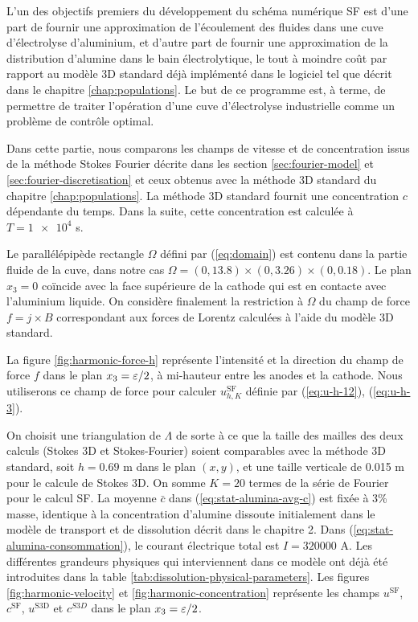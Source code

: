 L'un des objectifs premiers du développement du schéma numérique
SF est d'une part de fournir une approximation de l'écoulement des
fluides dans une cuve d'électrolyse d'aluminium, et d'autre part
de fournir une approximation de la distribution d'alumine dans le bain
électrolytique, le tout à moindre coût par rapport au modèle
3D standard déjà implémenté dans le logiciel \citealucell{} tel que décrit
dans le chapitre \ref{chap:populations}. Le but de ce programme est,
à terme, de permettre de traiter l'opération d'une cuve
d'électrolyse industrielle comme un problème de contrôle optimal.

Dans cette partie, nous comparons les champs de vitesse et de
concentration issus de la méthode Stokes Fourier décrite dans les
section \ref{sec:fourier-model} et \ref{sec:fourier-discretisation} et
ceux obtenus avec la méthode 3D standard du chapitre
\ref{chap:populations}. La méthode 3D standard fournit une
concentration $c$ dépendante du temps. Dans la suite, cette
concentration est calculée à $T = \num{1e4}$ \si{\second}.

Le parallélépipède rectangle $\Omega$ défini par (\ref{eq:domain}) est
contenu dans la partie fluide de la cuve, dans notre cas $\Omega = (0,
\num{13.8})\times(0,\num{3.26})\times(0,\num{0.18})$. Le plan $x_3 =
0$ coïncide avec la face supérieure de la cathode qui est en contacte
avec l'aluminium liquide. On considère finalement la restriction à
$\Omega$ du champ de force $f = j\times B$ correspondant aux forces de
Lorentz calculées à l'aide du modèle 3D standard.

La figure \ref{fig:harmonic-force-h} représente l'intensité et la
direction du champ de force $f$ dans le plan $x_3 = \varepsilon / 2$,
à mi-hauteur entre les anodes et la cathode. Nous utiliserons ce champ
de force pour calculer $u_{h,K}^\mathrm{SF}$ définie par
(\ref{eq:u-h-12}), (\ref{eq:u-h-3}).

On choisit une triangulation de $\Lambda$ de sorte à ce que la taille
des mailles des deux calculs (Stokes 3D et Stokes-Fourier) soient
comparables avec la méthode 3D standard, soit $h = \num{0.69}$
\si{\meter} dans le plan $(x,y)$, et une taille verticale de
\num{0.015} \si{\meter} pour le calcule de Stokes 3D. On somme $K =
20$ termes de la série de Fourier pour le calcul SF. La moyenne
$\bar{c}$ dans (\ref{eq:stat-alumina-avg-c}) est fixée à 3\% masse,
identique à la concentration d'alumine dissoute initialement dans le
modèle de transport et de dissolution décrit dans le chapitre 2. Dans
(\ref{eq:stat-alumina-consommation}), le courant électrique total est
$I = \num{320000}$ \si{\ampere}. Les différentes grandeurs physiques
qui interviennent dans ce modèle ont déjà été introduites dans la
table \ref{tab:dissolution-physical-parameters}. Les figures
\ref{fig:harmonic-velocity} et \ref{fig:harmonic-concentration}
représente les champs $u^{\mathrm{SF}}$, $c^\mathrm{SF}$,
$u^\mathrm{S3D}$ et $c^{S3D}$ dans le plan $x_3 = \varepsilon / 2$.

